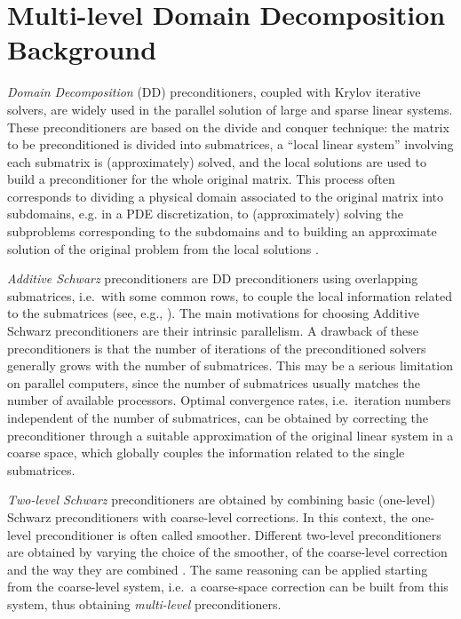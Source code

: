 \section{Multi-level Domain Decomposition Background\label{sec:background}}

\emph{Domain Decomposition} (DD) preconditioners, coupled with Krylov iterative
solvers, are widely used in the parallel solution of large and sparse linear systems.
These preconditioners are based on the divide and conquer technique: the matrix
to be preconditioned is divided into submatrices, a ``local linear system''
involving each submatrix is (approximately) solved, and the local solutions are used
to build a preconditioner for the whole original matrix. This process
often corresponds to dividing a physical domain associated to the original matrix
into subdomains, e.g. in a PDE discretization, to (approximately) solving the
subproblems corresponding to the subdomains and to building an approximate
solution of the original problem from the local solutions 
\cite{Cai_Widlund_92,dd1_94,dd2_96}. 

\emph{Additive Schwarz} preconditioners are DD preconditioners using overlapping
submatrices, i.e.\ with some common rows, to couple the local information
related to the submatrices (see, e.g., \cite{dd2_96}).
The main motivations for choosing Additive Schwarz preconditioners are their
intrinsic parallelism. A drawback of these
preconditioners is that the number of iterations of the preconditioned solvers
generally grows with the number of submatrices. This may be a serious limitation
on parallel computers, since the number of submatrices usually matches the number
of available processors. Optimal convergence rates, i.e.\ iteration numbers
independent of the number of submatrices, can be obtained by correcting the
preconditioner through a suitable approximation of the original linear system
in a coarse space, which globally couples the information related to the single
submatrices. 

\emph{Two-level Schwarz} preconditioners are obtained
by combining basic (one-level) Schwarz preconditioners with coarse-level
corrections. In this context, the one-level preconditioner is often
called smoother. Different two-level preconditioners are obtained by varying the
choice of the smoother, of the coarse-level correction and the
way they are combined \cite{dd2_96}. The same reasoning can be applied starting
from the coarse-level system, i.e.\ a coarse-space correction can be built
from this system, thus obtaining \emph{multi-level} preconditioners.

